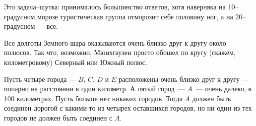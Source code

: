 ﻿
\begin{itemize}
\itA Это задача–шутка: принималось большинство ответов, хотя наверняка на 10--градусном морозе туристическая группа отморозит себе половину ног, а на 20--градусном — все.

\itB Все долготы Земного шара оказываются очень близко друг к другу около полюсов. Так что, возможно, Мюнхгаузен просто обошел по кругу (скажем, километровому) Северный или Южный полюс.

\itC Пусть четыре города — $B$, $C$, $D$ и $E$ расположены очень близко друг к другу — попарно на расстоянии в один километр. А пятый город~— $A$~— очень далеко, в 100 километрах. Пусть больше нет никаких городов. Тогда $A$ должен быть соединен дорогой с какими-то из  четырех оставшихся городов, но ни один из тех городов не должен быть соединен с $A$.
\end{itemize}